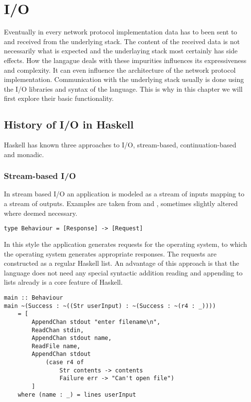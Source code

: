 \chapter{I/O}
Eventually in every network protocol implementation data has to been sent to and received from the underlying stack.
The content of the received data is not necessarily what is expected and the underlaying stack most certainly has side effects.
How the langague deals with these impurities influences its expressiveness and complexity.
It can even influence the architecture of the network protocol implementation.
Communication with the underlying stack usually is done using the I/O libraries and syntax of the language.
This is why in this chapter we will first explore their basic functionality.
\section{History of I/O in Haskell}
Haskell has known three approaches to I/O, stream-based, continuation-based and monadic.
\subsection{Stream-based I/O}
In stream based I/O an application is modeled as a stream of inputs mapping to a stream of outputs. Examples are taken from \cite{hudak_history_2007} and \cite{hudak_conception_1989}, sometimes slightly altered where deemed necessary.

\begin{lstlisting}[caption={Mapping of responses to requests}]
type Behaviour = [Response] -> [Request]
\end{lstlisting}

In this style the application generates requests for the operating system, to which the operating system generates appropriate responses. The requests are constructed as a regular Haskell list. An advantage of this approach is that the language does not need any special syntactic addition reading and appending to lists already is a core feature of Haskell.

\begin{lstlisting}[caption={Example of stream-based I/O in Haskell}]
main :: Behaviour
main ~(Success : ~((Str userInput) : ~(Success : ~(r4 : _))))
	= [
		AppendChan stdout "enter filename\n",
		ReadChan stdin,
		AppendChan stdout name,
		ReadFile name,
		AppendChan stdout
			(case r4 of
				Str contents -> contents
				Failure err -> "Can't open file")
		]
	where (name : _) = lines userInput
\end{lstlisting}

